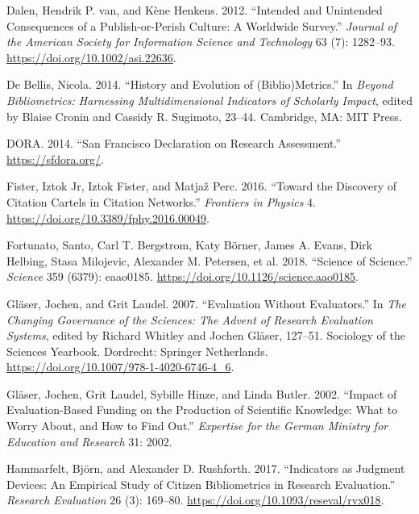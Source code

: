 \documentclass[]{elsarticle} %
\begin{document}
\leavevmode\hypertarget{ref-dalenIntendedUnintendedConsequences2012}{}%
Dalen, Hendrik P. van, and Kène Henkens. 2012. ``Intended and Unintended
Consequences of a Publish-or-Perish Culture: A Worldwide Survey.''
\emph{Journal of the American Society for Information Science and
Technology} 63 (7): 1282--93. \url{https://doi.org/10.1002/asi.22636}.

\leavevmode\hypertarget{ref-debellisHistoryEvolutionBiblio2014}{}%
De Bellis, Nicola. 2014. ``History and Evolution of (Biblio)Metrics.''
In \emph{Beyond Bibliometrics: Harnessing Multidimensional Indicators of
Scholarly Impact}, edited by Blaise Cronin and Cassidy R. Sugimoto,
23--44. Cambridge, MA: MIT Press.

\leavevmode\hypertarget{ref-doraSanFranciscoDeclaration2014}{}%
DORA. 2014. ``San Francisco Declaration on Research Assessment.''
\url{https://sfdora.org/}.

\leavevmode\hypertarget{ref-fisterDiscoveryCitationCartels2016}{}%
Fister, Iztok Jr, Iztok Fister, and Matjaž Perc. 2016. ``Toward the
Discovery of Citation Cartels in Citation Networks.'' \emph{Frontiers in
Physics} 4. \url{https://doi.org/10.3389/fphy.2016.00049}.

\leavevmode\hypertarget{ref-fortunatoScienceScience2018}{}%
Fortunato, Santo, Carl T. Bergstrom, Katy Börner, James A. Evans, Dirk
Helbing, Stasa Milojevic, Alexander M. Petersen, et al. 2018. ``Science
of Science.'' \emph{Science} 359 (6379): eaao0185.
\url{https://doi.org/10.1126/science.aao0185}.

\leavevmode\hypertarget{ref-glaserEvaluationEvaluators2007}{}%
Gläser, Jochen, and Grit Laudel. 2007. ``Evaluation Without
Evaluators.'' In \emph{The Changing Governance of the Sciences: The
Advent of Research Evaluation Systems}, edited by Richard Whitley and
Jochen Gläser, 127--51. Sociology of the Sciences Yearbook. Dordrecht:
Springer Netherlands. \url{https://doi.org/10.1007/978-1-4020-6746-4_6}.

\leavevmode\hypertarget{ref-glaserImpactEvaluationbasedFunding2002}{}%
Gläser, Jochen, Grit Laudel, Sybille Hinze, and Linda Butler. 2002.
``Impact of Evaluation-Based Funding on the Production of Scientific
Knowledge: What to Worry About, and How to Find Out.'' \emph{Expertise
for the German Ministry for Education and Research} 31: 2002.

\leavevmode\hypertarget{ref-hammarfeltIndicatorsJudgmentDevices2017}{}%
Hammarfelt, Björn, and Alexander D. Rushforth. 2017. ``Indicators as
Judgment Devices: An Empirical Study of Citizen Bibliometrics in
Research Evaluation.'' \emph{Research Evaluation} 26 (3): 169--80.
\url{https://doi.org/10.1093/reseval/rvx018}.
\end{document}
